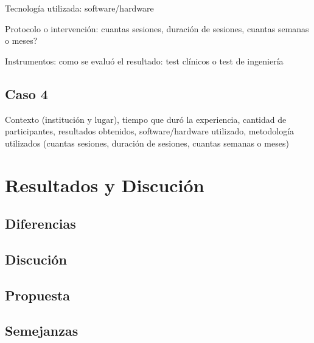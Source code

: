 \documentclass[journal]{IEEEtran}
\begin{document}
Tecnología utilizada: software/hardware 

Protocolo o intervención: cuantas sesiones, duración de sesiones, cuantas semanas o meses?

Instrumentos: como se evaluó el resultado: test clínicos o test de ingeniería 


\subsection{Caso 4}
Contexto (institución y lugar), tiempo que duró la experiencia, cantidad de participantes, resultados obtenidos, software/hardware utilizado, metodología utilizados (cuantas sesiones, duración de sesiones, cuantas semanas o meses) 

\section{Resultados y Discución}
\subsection{Diferencias}
\subsection{Discución}
\subsection{Propuesta}
\subsection{Semejanzas}






\balance






\end{document}
